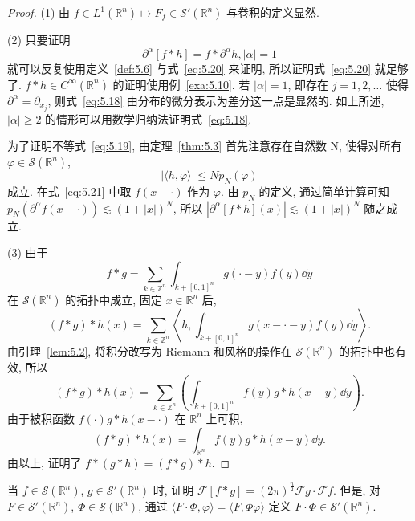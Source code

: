 \begin{proof}
(1) 由 $f \in L^{1}(\mathbb{R}^{n}) \mapsto F_{f} \in \mathcal{S}'(\mathbb{R}^{n})$ 与卷积的定义显然.

(2) 只要证明
\begin{equation}\tag{5.20}
\partial^{\alpha}[f*h] = f*\partial^{\alpha}h, |\alpha| = 1
\label{eq:5.20}
\end{equation}
就可以反复使用定义~\ref{def:5.6} 与式~\eqref{eq:5.20} 来证明, 所以证明式~\eqref{eq:5.20} 就足够了. $f*h \in C^{\infty}(\mathbb{R}^{n})$ 的证明使用例~\ref{exa:5.10}. 若 $|\alpha| = 1$, 即存在 $j = 1, 2, \ldots$ 使得 $\partial^{\alpha} = \partial_{x_{j}}$, 则式~\eqref{eq:5.18} 由分布的微分表示为差分这一点是显然的. 如上所述, $|\alpha| \geq 2$ 的情形可以用数学归纳法证明式~\eqref{eq:5.18}.

为了证明不等式~\eqref{eq:5.19}, 由定理~\ref{thm:5.3} 首先注意存在自然数 N, 使得对所有 $\varphi \in \mathcal{S}(\mathbb{R}^{n})$,
\begin{equation}\tag{5.21}
|\langle h, \varphi\rangle| \leq Np_{N}(\varphi)
\label{eq:5.21}
\end{equation}
成立. 在式~\eqref{eq:5.21} 中取 $f(x - \cdot)$ 作为 $\varphi$. 由 $p_{N}$ 的定义, 通过简单计算可知 $p_{N}(\partial^{\alpha}f(x - \cdot)) \lesssim (1+|x|)^{N}$, 所以 $|\partial^{\alpha}[f*h](x)| \lesssim (1+|x|)^{N}$ 随之成立.

(3) 由于
\[
f*g = \sum_{k \in \mathbb{Z}^{n}}\int_{k+[0,1]^{n}}g(\cdot - y)f(y)\dd y
\]
在 $\mathcal{S}(\mathbb{R}^{n})$ 的拓扑中成立, 固定 $x \in \mathbb{R}^{n}$ 后,
\[
(f*g)*h(x) = \sum_{k \in \mathbb{Z}^{n}}\left\langle h, \int_{k+[0,1]^{n}}g(x - \cdot - y)f(y)\dd y\right\rangle.
\]
由引理~\ref{lem:5.2}, 将积分改写为 Riemann 和风格的操作在 $\mathcal{S}(\mathbb{R}^{n})$ 的拓扑中也有效, 所以
\[
(f*g)*h(x) = \sum_{k \in \mathbb{Z}^{n}}\left(\int_{k+[0,1]^{n}}f(y)g*h(x-y)\dd y\right).
\]
由于被积函数 $f(\cdot)g*h(x - \cdot)$ 在 $\mathbb{R}^{n}$ 上可积,
\[
(f*g)*h(x) = \int_{\mathbb{R}^{n}}f(y)g*h(x-y)\dd y.
\]
由以上, 证明了 $f*(g*h) = (f*g)*h$.
\end{proof}

\begin{exercise}\label{exer:5.12}
当 $f \in \mathcal{S}(\mathbb{R}^{n})$, $g \in \mathcal{S}'(\mathbb{R}^{n})$ 时, 证明 $\mathcal{F}[f*g] = (2\pi)^{\frac{n}{2}}\mathcal{F}g \cdot \mathcal{F}f$. 但是, 对 $F \in \mathcal{S}'(\mathbb{R}^{n})$, $\Phi \in \mathcal{S}(\mathbb{R}^{n})$, 通过 $\langle F \cdot \Phi, \varphi\rangle = \langle F, \Phi\varphi\rangle$ 定义 $F \cdot \Phi \in \mathcal{S}'(\mathbb{R}^{n})$.
\end{exercise}
